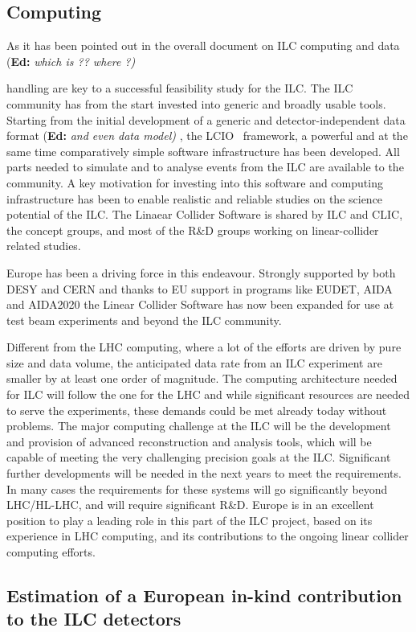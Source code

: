 \documentclass[%
 reprint,
 floatfix,
 amsmath,amssymb,
 aps,
]{revtex4-1}
\newif\ifEdNotes \EdNotestrue
\newcommand{\doednote}[1]{{\color{red}(\textbf{Ed:} \textit{#1)}}}
\newcommand{\ednote}[1]{\ifEdNotes 
  \doednote{#1} 
\fi}
\begin{document}
\subsection{Computing}
As it has been pointed out in the overall document on ILC computing and data \ednote{which is ?? where ?}
handling are key to a successful feasibility study for the ILC. The ILC community 
has from the start invested into generic and broadly usable tools. Starting from 
the initial development of a generic and detector-independent data format \ednote{and even data model}, the 
LCIO~\cite{bib:lcio} framework, a powerful and at the same time comparatively simple software 
infrastructure has been developed. All parts needed to simulate and to analyse 
events from the ILC are available to the community. A key motivation for investing
into this software and computing infrastructure has been to enable realistic and reliable 
studies on the science potential of the ILC. The Linaear Collider Software is shared by ILC and 
CLIC, the concept groups, and most of the R\&D groups working on linear-collider related 
studies. 

Europe has been a driving force in this endeavour. Strongly 
supported by both DESY and CERN and thanks to EU support in programs like EUDET, 
AIDA and AIDA2020 the Linear Collider Software has now been expanded for use at test 
beam experiments and beyond the ILC community.


Different from the LHC computing, where a lot of the efforts are driven by pure 
size and data volume, the anticipated data rate from an ILC experiment are 
smaller by at least one order of magnitude. The computing architecture needed for 
ILC will follow the one for the LHC and while significant resources are needed 
to serve the experiments, these demands could be met already today without problems. 
The major computing challenge at the ILC will be the development and provision 
of advanced reconstruction and analysis tools, which will be capable of meeting 
the very challenging precision goals at the ILC. Significant further 
developments will be needed in the next years to meet the requirements. 
In many cases the requirements for these systems will go significantly beyond LHC/HL-LHC, 
and will require significant R\&D. Europe is in an excellent position to play a 
leading role in this part of the ILC project, based on its experience in LHC 
computing, and its contributions to the ongoing linear collider computing efforts. 

\subsection{\label{sec:det:constructionmodel} Estimation of a
European in-kind contribution to the ILC detectors}
\end{document}
